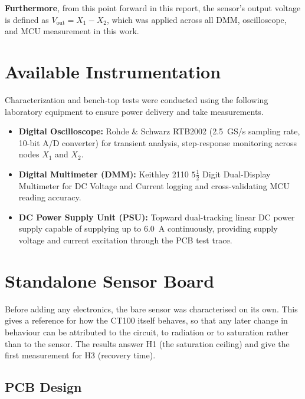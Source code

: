 \documentclass[12pt,a4paper]{article}
\begin{document}
\textbf{Furthermore}, from this point forward in this report, the sensor's output voltage is defined as \textbf{$V_{\text{out}} = X_1 - X_2$}, which was applied  across all DMM, oscilloscope, and MCU measurement in this work.



\section{Available Instrumentation}
\label{sec:instrumentation}

Characterization and bench-top tests were conducted using the following laboratory equipment to ensure power delivery and take measurements.

\begin{itemize}
    \item \textbf{Digital Oscilloscope:} Rohde \& Schwarz RTB2002 (\SI{2.5}{GS/s} sampling rate, 10-bit A/D converter) for transient analysis, step-response monitoring across nodes \(X_1\) and \(X_2\).
    \item \textbf{ Digital Multimeter (DMM):} Keithley 2110 \(5\frac{1}{2}\) Digit Dual-Display Multimeter for DC Voltage and Current logging and cross-validating MCU reading accuracy.
    
    \item \textbf{DC Power Supply Unit (PSU):} Topward dual-tracking linear DC power supply capable of supplying up to \SI{6.0}{\ampere} continuously, providing supply voltage  and current excitation through the PCB test trace.
    
    \end{itemize}

\section{Standalone Sensor Board}
\label{sec:standalone-board}

Before adding any electronics, the bare sensor was characterised on its own. This gives a reference for how the CT100 itself behaves, so that any later change in behaviour can be attributed to the circuit, to radiation or to saturation rather than to the sensor. The results answer H1 (the saturation ceiling) and give the first measurement for H3 (recovery time).

\subsection{PCB Design}
\label{sec:standalone-pcb}
\end{document}
